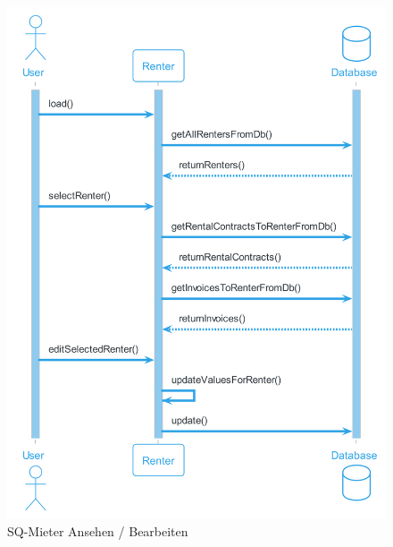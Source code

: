 \begin{figure}[H]
  \begin{center}
    \includegraphics[width=0.7\linewidth]{content/diagrams/out/sequenzdiagram/mieterAnsehen/mieterAnsehen.png}
    \caption{SQ-Mieter Ansehen / Bearbeiten}
    \label{sqMieter}
  \end{center}
\end{figure}

